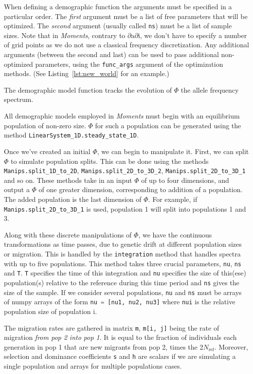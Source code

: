 \documentclass[12pt]{article}
\makeatletter
\newcommand{\dadi}{$\partial$a$\partial$i\xspace}
\newcommand{\Nref}{\ensuremath{N_\text{ref}}\xspace}
\newcommand{\py}[1]{\lstinline[language=Python, showstringspaces=False]@#1@}
\makeatother
\begin{document}
When defining a demographic function the arguments must be specified in a particular order.
The \emph{first} argument must be a list of free parameters that will be optimized.
The \emph{second} argument (usually called \py{ns}) must be a list of sample sizes.
Note that in \textit{Moments}, contrary to \dadi, we don't have to specify a number of grid points as we do not use a classical frequency discretization.
Any additional arguments (between the second and last) can be used to pass additional non-optimized parameters, using the \py{func_args} argument of the optimization methods.
(See Listing~\ref{lst:new_world} for an example.)

The demographic model function tracks the evolution of $\Phi$ the allele frequency spectrum.

All demographic models employed in \textit{Moments} must begin with an equilibrium population of non-zero size.
$\Phi$ for such a population can be generated using the method \py{LinearSystem_1D.steady_state_1D}.

Once we've created an initial $\Phi$, we can begin to manipulate it.
First, we can split $\Phi$ to simulate population splits.
This can be done using the methods \py{Manips.split_1D_to_2D}, \py{Manips.split_2D_to_3D_2}, \py{Manips.split_2D_to_3D_1} and so on.
These methods take in an input $\Phi$ of up to four dimensions, and output a $\Phi$ of one greater dimension, corresponding to addition of a population.
The added population is the last dimension of $\Phi$.
For example, if \py{Manips.split_2D_to_3D_1} is used, population 1 will split into populations 1 and 3.

Along with these discrete manipulations of $\Phi$, we have the continuous transformations as time passes, due to genetic drift at different population sizes or migration.
This is handled by the \py{integration} method that handles spectra with up to five populations.
This method takes three crucial parameters, \py{nu}, \py{ns} and \py{T}.
\py{T} specifies the time of this integration and \py{nu} specifies the size of this(ese) population(s) relative to the reference during this time period and \py{ns} gives the size of the sample. If we consider several populations, \py{nu} and \py{ns} must be arrays of numpy arrays of the form \py{nu = [nu1, nu2, nu3]} where \py{nui} is the relative population size of population i.

The migration rates are gathered in matrix \py{m}, \py{m[i, j]} being the rate of migration \emph{from pop 2 into pop 1}. 
It is equal to the fraction of individuals each generation in pop 1 that are new migrants from pop 2, times the 2\Nref. Moreover, selection and dominance coefficients \py{s} and \py{h} are scalars if we are simulating a single population and arrays for multiple populations cases. 
\end{document}
